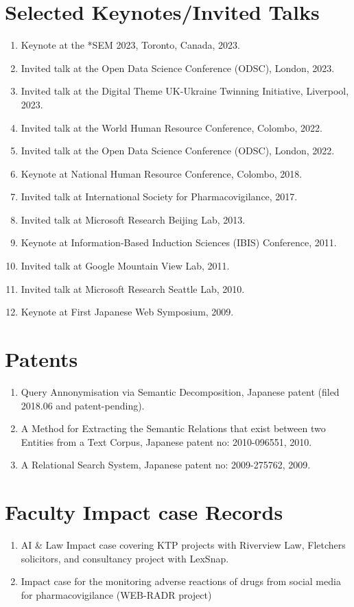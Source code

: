 \documentclass[a4paper,11pt]{article}
\begin{document}
\section{Selected Keynotes/Invited Talks}
\begin{enumerate}
\item Keynote at the *SEM 2023, Toronto, Canada, 2023.
\item Invited talk at the Open Data Science Conference (ODSC), London, 2023.
\item Invited talk at the Digital Theme UK-Ukraine Twinning Initiative, Liverpool, 2023.
\item Invited talk at the World Human Resource Conference, Colombo, 2022.
\item Invited talk at the Open Data Science Conference (ODSC), London, 2022.
\item Keynote at National Human Resource Conference, Colombo, 2018.
\item Invited talk at International Society for Pharmacovigilance, 2017.
\item Invited talk at Microsoft Research Beijing Lab, 2013.
\item Keynote at Information-Based Induction Sciences (IBIS) Conference, 2011.
\item Invited talk at Google Mountain View Lab, 2011.
\item Invited talk at Microsoft Research Seattle Lab, 2010.
\item Keynote at First Japanese Web Symposium, 2009.
\end{enumerate}


\section{Patents}
\begin{enumerate}
\item Query Annonymisation via Semantic Decomposition, Japanese patent (filed 2018.06 and patent-pending).
\item A Method for Extracting the Semantic Relations that exist between two Entities from a Text Corpus, Japanese patent no: 2010-096551, 2010.
\item A Relational Search System, Japanese patent no: 2009-275762, 2009.
\end{enumerate}

\section{Faculty Impact case Records}
\begin{enumerate}
\item AI \& Law Impact case covering KTP projects with Riverview Law, Fletchers solicitors, and consultancy project with LexSnap.
\item Impact case for the monitoring adverse reactions of drugs from social media for pharmacovigilance (WEB-RADR project)
\end{enumerate}
\end{document}
